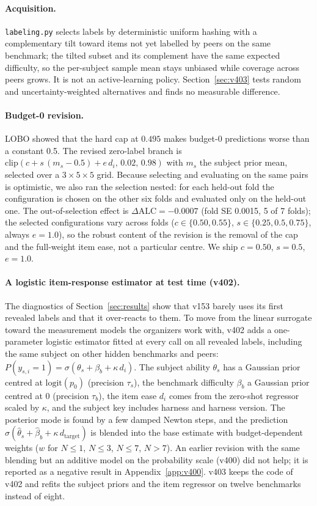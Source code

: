\documentclass{article}
\begin{document}
\paragraph{Acquisition.} \texttt{labeling.py} selects labels by deterministic uniform hashing with a complementary tilt toward items not yet labelled by peers on the same benchmark; the tilted subset and its complement have the same expected difficulty, so the per-subject sample mean stays unbiased while coverage across peers grows. It is not an active-learning policy. Section~\ref{sec:v403} tests random and uncertainty-weighted alternatives and finds no measurable difference.

\paragraph{Budget-0 revision.}
\label{sec:b0}
LOBO showed that the hard cap at $0.495$ makes budget-0 predictions worse than a constant 0.5. The revised zero-label branch is $\text{clip}(c + s\,(m_s-0.5) + e\,d_i,\,0.02,\,0.98)$ with $m_s$ the subject prior mean, selected over a $3\times5\times5$ grid. Because selecting and evaluating on the same pairs is optimistic, we also ran the selection nested: for each held-out fold the configuration is chosen on the other six folds and evaluated only on the held-out one. The out-of-selection effect is $\Delta\text{ALC}=-0.0007$ (fold SE 0.0015, 5 of 7 folds); the selected configurations vary across folds ($c\in\{0.50,0.55\}$, $s\in\{0.25,0.5,0.75\}$, always $e=1.0$), so the robust content of the revision is the removal of the cap and the full-weight item ease, not a particular centre. We ship $c=0.50$, $s=0.5$, $e=1.0$.

\paragraph{A logistic item-response estimator at test time (v402).}
\label{sec:v402}
The diagnostics of Section~\ref{sec:results} show that v153 barely uses its first revealed labels and that it over-reacts to them. To move from the linear surrogate toward the measurement models the organizers work with, v402 adds a one-parameter logistic estimator fitted at every call on all revealed labels, including the same subject on other hidden benchmarks and peers: $P(y_{s,i}=1)=\sigma(\theta_s+\beta_b+\kappa\,d_i)$. The subject ability $\theta_s$ has a Gaussian prior centred at $\mathrm{logit}(p_0)$ (precision $\tau_s$), the benchmark difficulty $\beta_b$ a Gaussian prior centred at 0 (precision $\tau_b$), the item ease $d_i$ comes from the zero-shot regressor scaled by $\kappa$, and the subject key includes harness and harness version. The posterior mode is found by a few damped Newton steps, and the prediction $\sigma(\hat\theta_s+\hat\beta_b+\kappa\,d_{\text{target}})$ is blended into the base estimate with budget-dependent weights ($w$ for $N\le1$, $N\le3$, $N\le7$, $N>7$). An earlier revision with the same blending but an additive model on the probability scale (v400) did not help; it is reported as a negative result in Appendix~\ref{app:v400}. v403 keeps the code of v402 and refits the subject priors and the item regressor on twelve benchmarks instead of eight.
\end{document}
